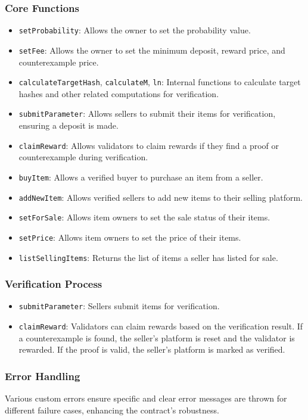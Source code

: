 \documentclass[runningheads]{llncs}
\begin{document}
\subsubsection{Core Functions}
\begin{itemize}
    \item \texttt{setProbability}: Allows the owner to set the probability value.
    \item \texttt{setFee}: Allows the owner to set the minimum deposit, reward price, and counterexample price.
    \item \texttt{calculateTargetHash}, \texttt{calculateM}, \texttt{ln}: Internal functions to calculate target hashes and other related computations for verification.
    \item \texttt{submitParameter}: Allows sellers to submit their items for verification, ensuring a deposit is made.
    \item \texttt{claimReward}: Allows validators to claim rewards if they find a proof or counterexample during verification.
    \item \texttt{buyItem}: Allows a verified buyer to purchase an item from a seller.
    \item \texttt{addNewItem}: Allows verified sellers to add new items to their selling platform.
    \item \texttt{setForSale}: Allows item owners to set the sale status of their items.
    \item \texttt{setPrice}: Allows item owners to set the price of their items.
    \item \texttt{listSellingItems}: Returns the list of items a seller has listed for sale.
\end{itemize}

\subsubsection{Verification Process}
\begin{itemize}
    \item \texttt{submitParameter}: Sellers submit items for verification.
    \item \texttt{claimReward}: Validators can claim rewards based on the verification result. If a counterexample is found, the seller's platform is reset and the validator is rewarded. If the proof is valid, the seller's platform is marked as verified.
\end{itemize}

\subsubsection{Error Handling}
Various custom errors ensure specific and clear error messages are thrown for different failure cases, enhancing the contract's robustness.
\end{document}
